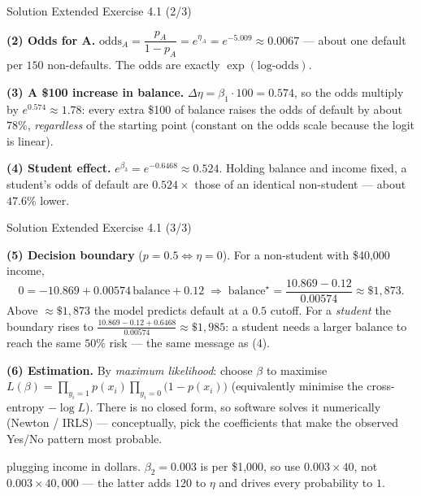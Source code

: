 \documentclass[aspectratio=169,11pt]{beamer}
\begin{document}
\begin{frame}{Solution \textemdash{} Extended Exercise 4.1 (2/3)}
\begin{solutionbox}
\textbf{(2) Odds for A.}
$\text{odds}_A=\dfrac{p_A}{1-p_A}=e^{\eta_A}=e^{-5.009}\approx 0.0067$ ---
about one default per $150$ non-defaults. The odds are exactly
$\exp(\text{log-odds})$.

\vspace{1mm}
\textbf{(3) A \$100 increase in balance.}
$\Delta\eta=\beta_1\cdot 100=0.574$, so the odds multiply by
$e^{0.574}\approx 1.78$: every extra \$100 of balance raises the odds of
default by about $78\%$, \emph{regardless} of the starting point
(constant on the odds scale because the logit is linear).

\vspace{1mm}
\textbf{(4) Student effect.}
$e^{\beta_3}=e^{-0.6468}\approx 0.524$. Holding balance and income fixed,
a student's odds of default are $0.524\times$ those of an identical
non-student --- about $47.6\%$ lower.
\end{solutionbox}
\end{frame}

\begin{frame}{Solution \textemdash{} Extended Exercise 4.1 (3/3)}
\begin{solutionbox}
\textbf{(5) Decision boundary} ($p=0.5\iff\eta=0$). For a non-student with
\$40{,}000 income,
\[
  0=-10.869+0.00574\,\text{balance}+0.12
  \;\Rightarrow\;
  \text{balance}^\star=\frac{10.869-0.12}{0.00574}\approx \$1{,}873 .
\]
Above $\approx\$1{,}873$ the model predicts default at a $0.5$ cutoff. For
a \emph{student} the boundary rises to
$\frac{10.869-0.12+0.6468}{0.00574}\approx \$1{,}985$: a student needs a
larger balance to reach the same $50\%$ risk --- the same message as (4).

\vspace{1mm}
\textbf{(6) Estimation.}
By \emph{maximum likelihood}: choose $\beta$ to maximise
$L(\beta)=\prod_{y_i=1}p(x_i)\prod_{y_i=0}\bigl(1-p(x_i)\bigr)$
(equivalently minimise the cross-entropy $-\log L$). There is no closed
form, so software solves it numerically (Newton / IRLS) --- conceptually,
pick the coefficients that make the observed Yes/No pattern most probable.
\end{solutionbox}
\begin{mistake}
plugging income in dollars. $\beta_2=0.003$ is
per \$1{,}000, so use $0.003\times 40$, not $0.003\times 40{,}000$ ---
the latter adds $120$ to $\eta$ and drives every probability to $1$.
\end{mistake}
\end{frame}
\end{document}
